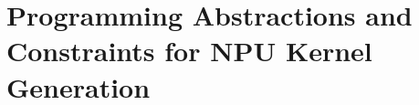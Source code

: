 \section{Programming Abstractions and Constraints for NPU Kernel Generation}
\label{sec:programming_constraints}

